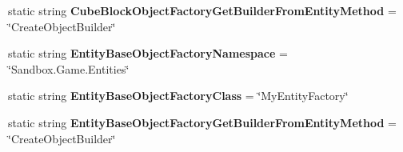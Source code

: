 \begin{DoxyCompactItemize}
\item 
\hypertarget{class_s_e_mod_a_p_i_internal_1_1_a_p_i_1_1_common_1_1_sandbox_game_assembly_wrapper_a4940390c5c07885cf66241b9bdc43c5a}{}static string {\bfseries Cube\+Block\+Object\+Factory\+Get\+Builder\+From\+Entity\+Method} = \char`\"{}Create\+Object\+Builder\char`\"{}\label{class_s_e_mod_a_p_i_internal_1_1_a_p_i_1_1_common_1_1_sandbox_game_assembly_wrapper_a4940390c5c07885cf66241b9bdc43c5a}

\item 
\hypertarget{class_s_e_mod_a_p_i_internal_1_1_a_p_i_1_1_common_1_1_sandbox_game_assembly_wrapper_afaf56b97655947f38b341eded206276c}{}static string {\bfseries Entity\+Base\+Object\+Factory\+Namespace} = \char`\"{}Sandbox.\+Game.\+Entities\char`\"{}\label{class_s_e_mod_a_p_i_internal_1_1_a_p_i_1_1_common_1_1_sandbox_game_assembly_wrapper_afaf56b97655947f38b341eded206276c}

\item 
\hypertarget{class_s_e_mod_a_p_i_internal_1_1_a_p_i_1_1_common_1_1_sandbox_game_assembly_wrapper_ad838af41144958342d846b085e7d922d}{}static string {\bfseries Entity\+Base\+Object\+Factory\+Class} = \char`\"{}My\+Entity\+Factory\char`\"{}\label{class_s_e_mod_a_p_i_internal_1_1_a_p_i_1_1_common_1_1_sandbox_game_assembly_wrapper_ad838af41144958342d846b085e7d922d}

\item 
\hypertarget{class_s_e_mod_a_p_i_internal_1_1_a_p_i_1_1_common_1_1_sandbox_game_assembly_wrapper_aa061b544c2cbdf631b455d2f5e3c345e}{}static string {\bfseries Entity\+Base\+Object\+Factory\+Get\+Builder\+From\+Entity\+Method} = \char`\"{}Create\+Object\+Builder\char`\"{}\label{class_s_e_mod_a_p_i_internal_1_1_a_p_i_1_1_common_1_1_sandbox_game_assembly_wrapper_aa061b544c2cbdf631b455d2f5e3c345e}

\end{DoxyCompactItemize}

